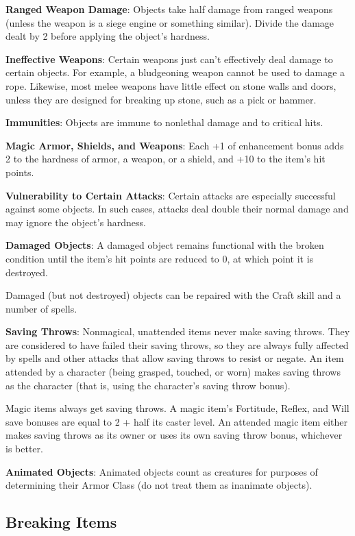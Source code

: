 \textbf{Ranged Weapon Damage}: Objects take half damage from ranged weapons (unless the weapon is a siege engine or something similar). Divide the damage dealt by 2 before applying the object's hardness.
			
\textbf{Ineffective Weapons}: Certain weapons just can't effectively deal damage to certain objects. For example, a bludgeoning weapon cannot be used to damage a rope. Likewise, most melee weapons have little effect on stone walls and doors, unless they are designed for breaking up stone, such as a pick or hammer.
			
\textbf{Immunities}: Objects are immune to nonlethal damage and to critical hits.
			
\textbf{Magic Armor, Shields, and Weapons}: Each +1 of enhancement bonus adds 2 to the hardness of armor, a weapon, or a shield, and +10 to the item's hit points.
			
\textbf{Vulnerability to Certain Attacks}: Certain attacks are especially successful against some objects. In such cases, attacks deal double their normal damage and may ignore the object's hardness.
			
\textbf{Damaged Objects}: A damaged object remains functional with the broken condition until the item's hit points are reduced to 0, at which point it is destroyed.
			
Damaged (but not destroyed) objects can be repaired with the Craft skill and a number of spells.
			
\textbf{Saving Throws}: Nonmagical, unattended items never make saving throws. They are considered to have failed their saving throws, so they are always fully affected by spells and other attacks that allow saving throws to resist or negate. An item attended by a character (being grasped, touched, or worn) makes saving throws as the character (that is, using the character's saving throw bonus).
			
Magic items always get saving throws. A magic item's Fortitude, Reflex, and Will save bonuses are equal to 2 + half its caster level. An attended magic item either makes saving throws as its owner or uses its own saving throw bonus, whichever is better.
			
\textbf{Animated Objects}: Animated objects count as creatures for purposes of determining their Armor Class (do not treat them as inanimate objects).
		
\subsection{Breaking Items}

